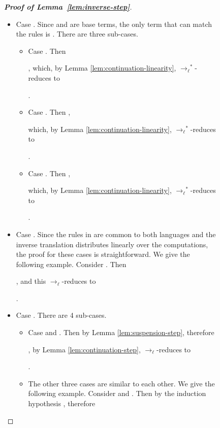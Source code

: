 \documentclass{LMCS}
\newcommand{\xto}[1]{\ensuremath{\rightarrow_{#1}}}
\newcommand{\tolinred}{\xto{\ell}}
\newcommand{\stolinred}{\ensuremath{\xto{\ell}^{\ast}}}
\newcommand{\toblinred}{\xto{\ell\cup\beta_v}}
\begin{document}
\begin{figure}
{\begin{proof}[\bf Proof of Lemma~\ref{lem:inverse-step}]
\begin{itemize}
\begin{itemize}
	  
	  .

	\item Case . Then
	  
	  ,
	  which, by Lemma \ref{lem:continuation-substitution}, is equal to
	  

	\item Case . Then  is a
	  base term, and hence ,
	  so
	  
	  ,
	  which, by Lemma \ref{lem:continuation-step}, \toblinred-reduces to
	  ,
	  which, by Lemma \ref{lem:substitution-lemma}, is equal to
	  
	  .
      \end{itemize}
    \item Case . Since  and  are base terms, the only term that
      can match the rules is . There are three sub-cases. 
      \begin{itemize}
	\item Case . Then 
	  
	  ,
	  which, by Lemma \ref{lem:continuation-linearity}, \stolinred-reduces to
	  
	  .
	\item Case . Then 
	  ,
	  
	  which, by Lemma \ref{lem:continuation-linearity}, \stolinred-reduces to
	  
	  .
	\item Case . Then 
	  ,
	  
	  which, by Lemma \ref{lem:continuation-linearity}, \stolinred-reduces to
	  
	  .
      \end{itemize}
    \item Case . Since the rules in  are common to both languages and
      the inverse translation  distributes linearly over
      the computations, the proof for these cases is straightforward. We
      give the following example. Consider .
      Then
      
      ,
      and this \tolinred-reduces to
      
      .

    \item Case . There are 4 sub-cases.
      \begin{itemize}
	\item Case  and . Then 
	  by Lemma \ref{lem:suspension-step}, therefore 
	  
	  ,
	  by Lemma \ref{lem:continuation-step}, \tolinred-reduces to
	  
	  .

	\item The other three cases are similar to each other. We give the following
	  example. Consider  and .
	  Then by the induction hypothesis ,
	  therefore 
	  

\end{itemize}
\end{itemize}
\end{proof}}
\end{figure}
\end{document}
